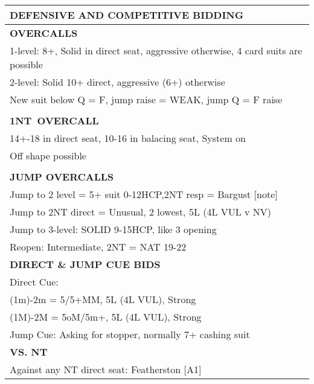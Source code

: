 \documentclass{article}
\newcommand\N{{\footnotesize NT}}
\begin{document}
\noindent
\small{
\begin{minipage}{90mm}
	\begin{tabular}{| p{88mm} |}
		\hline
		\cellcolor{green!25} \textbf{DEFENSIVE AND COMPETITIVE BIDDING} \\ \hline
		\cellcolor{orange!25}\textbf{OVERCALLS} \\ \hline
		1-level: 8+, Solid in direct seat, aggressive otherwise,
		4 card suits are possible\\ \hline
		2-level: Solid 10+ direct, aggressive (6+) otherwise\\ \hline
		New suit below Q = F, jump raise = WEAK, jump Q = F raise\\ \hline
		\\ \hline
		\cellcolor{orange!25}\textbf{1\N \ OVERCALL} \\ \hline
		14+-18 in direct seat, 10-16 in balacing seat,
		System on\\ \hline
		Off shape possible\\ \hline
		\\ \hline
		\cellcolor{orange!25}\textbf{JUMP OVERCALLS} \\ \hline
		Jump to 2 level = 5+ suit 0-12HCP,2{\N} resp = Bargust [note]\\ \hline
		Jump to 2{\N} direct = Unusual, 2 lowest, 5L (4L VUL v NV)\\ \hline
		Jump to 3-level: SOLID 9-15HCP, like 3 opening\\ \hline
		Reopen: Intermediate, 2{\N} = NAT 19-22\\ \hline
		\cellcolor{orange!25}\textbf{DIRECT \& JUMP CUE BIDS} \\ \hline
		Direct Cue:\\ \hline
		(1m)-2m = 5/5+MM, 5L (4L VUL), Strong\\ \hline
		(1M)-2M = 5oM/5m+, 5L (4L VUL), Strong\\ \hline
		Jump Cue: Asking for stopper, normally 7+ cashing suit\\ \hline
		\cellcolor{orange!25}\textbf{VS. NT} \\ \hline
		Against any NT direct seat: Featherston [A1]\\ \hline

\end{tabular}
\end{minipage}}
\end{document}
